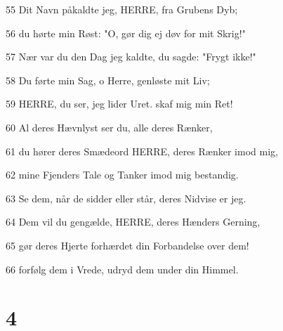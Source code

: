 \par 55 Dit Navn påkaldte jeg, HERRE, fra Grubens Dyb;
\par 56 du hørte min Røst: "O, gør dig ej døv for mit Skrig!"
\par 57 Nær var du den Dag jeg kaldte, du sagde: "Frygt ikke!"
\par 58 Du førte min Sag, o Herre, genløste mit Liv;
\par 59 HERRE, du ser, jeg lider Uret. skaf mig min Ret!
\par 60 Al deres Hævnlyst ser du, alle deres Rænker,
\par 61 du hører deres Smædeord HERRE, deres Rænker imod mig,
\par 62 mine Fjenders Tale og Tanker imod mig bestandig.
\par 63 Se dem, når de sidder eller står, deres Nidvise er jeg.
\par 64 Dem vil du gengælde, HERRE, deres Hænders Gerning,
\par 65 gør deres Hjerte forhærdet din Forbandelse over dem!
\par 66 forfølg dem i Vrede, udryd dem under din Himmel.

\chapter{4}

